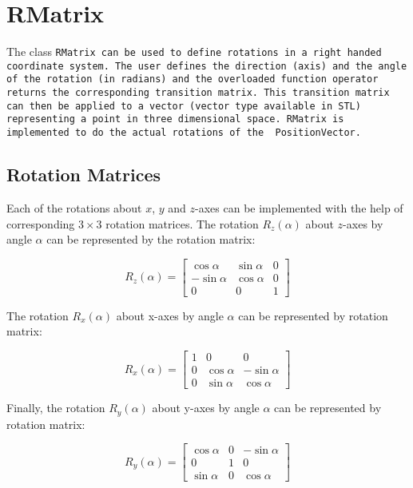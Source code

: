 \section{RMatrix}

The class \tt  RMatrix \rm can be used to define  rotations in a right
handed coordinate  system. The user  defines the direction  (axis) and
the angle  of the  rotation (in radians)  and the  overloaded function
operator returns the  corresponding transition matrix. This transition
matrix can then be applied to  a vector (\tt vector \rm type available
in STL) representing  a point in three dimensional  space. \tt RMatrix
\rm  is   implemented  to   do  the  actual   rotations  of   the  \tt
PositionVector\rm.

\subsection{Rotation Matrices}\label{ssc:rm}

Each of the  rotations about $x$, $y$ and  $z$-axes can be implemented
with the  help of corresponding  $3 \times 3$ rotation  matrices.  The
rotation  $R_{z}(\alpha)$  about $z$-axes  by  angle  $\alpha$ can  be
represented by the rotation matrix:

\begin{displaymath}
R_{z}(\alpha) =
\left[ 
\begin{array}{ccc}
\cos\alpha & \sin\alpha & 0 \\
-\sin\alpha & \cos\alpha & 0 \\
0 & 0 & 1 
\end{array}
\right]
\end{displaymath}  
 
The rotation $R_{x}(\alpha)$  about x-axes by angle $\alpha$ 
can be represented by rotation matrix:

\begin{displaymath}
R_{x}(\alpha) =
\left[ 
\begin{array}{ccc}
1 & 0 & 0 \\
0 & \cos\alpha & -\sin\alpha  \\
0 &\sin\alpha  &  \cos\alpha
\end{array}
\right]
\end{displaymath}  

Finally, the rotation $R_{y}(\alpha)$  about y-axes by angle $\alpha$
can be represented by rotation matrix:

\begin{displaymath}
R_{y}(\alpha) =
\left[ 
\begin{array}{ccc}
\cos\alpha & 0 & -\sin\alpha \\
0 & 1 & 0 \\
\sin\alpha & 0 & \cos\alpha
\end{array}
\right]
\end{displaymath}  

